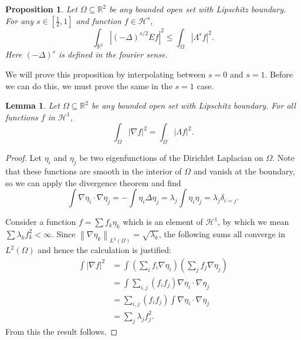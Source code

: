 \documentclass[11pt]{amsart}
\newtheorem{proposition}[theorem]{Proposition}
\newtheorem{lemma}[theorem]{Lemma}
\theoremstyle{remark}
\theoremstyle{definition}
\newcommand{\R}{\mathbb{R}}
\newcommand{\norm}[1]{\left\lVert#1\right\rVert}
\newcommand{\paren}[1]{\left( #1 \right)}
\newcommand{\abs}[1]{\left\lvert #1 \right\rvert}
\newcommand{\del}{\partial}
\newcommand{\grad}{\nabla}
\renewcommand{\div}{\operatorname{div}}
\newcommand{\Laplace}{\Delta}
\newcommand{\eigen}[1]{\eta_{#1}} %
\newcommand{\HD}{\mathcal{H}}
\begin{document}
\begin{proposition} \label{thm:hadamard 3 lines}
Let $\Omega \subseteq \R^2$ be any bounded open set with Lipschitz boundary.  For any $s \in [\frac{1}{2},1]$ and function $f \in \HD^s$,
\[ \int_{\R^2} \abs{\paren{-\Laplace}^{s/2} E f}^2 \leq \int_\Omega \abs{\Lambda^s f}^2. \]
Here $\paren{-\Laplace}^s$ is defined in the fourier sense.  
\end{proposition}

We will prove this proposition by interpolating between $s = 0$ and $s=1$.  Before we can do this, we must prove the same in the $s=1$ case.  

\begin{lemma} \label{thm:H1 and H1}
Let $\Omega \subseteq \R^2$ be any bounded open set with Lipschitz boundary.  For all functions $f$ in $\HD^1$,
\[ \int_\Omega \abs{\grad f}^2 = \int_\Omega \abs{\Lambda f}^2. \]
\end{lemma}

\begin{proof}
Let $\eigen{i}$ and $\eigen{j}$ be two eigenfunctions of the Dirichlet Laplacian on $\Omega$.  Note that these functions are smooth in the interior of $\Omega$ and vanish at the boundary, so we can apply the divergence theorem and find
\[ \int \grad \eigen{i} \cdot \grad \eigen{j} = - \int \eigen{i} \Laplace \eigen{j} = \lambda_j \int \eigen{i} \eigen{j} = \lambda_j \delta_{i=j}. \]

Consider a function $f = \sum f_k \eigen{k}$ which is an element of $\HD^1$, by which we mean $\sum \lambda_k f_k^2 < \infty$.  Since $\norm{\grad \eigen{k}}_{L^2(\Omega)} = \sqrt{\lambda_k}$, the following sums all converge in $L^2(\Omega)$ and hence the calculation is justified:
\begin{align*}
\int \abs{\grad f}^2 &= \int \paren{\sum_i f_i \grad \eigen{i} } \paren{\sum_j f_j \grad \eigen{j}}
\\ &= \int \sum_{i,j} (f_i f_j) \grad \eigen{i} \cdot \grad \eigen{j}
\\ &= \sum_{i,j} (f_i f_j) \int \grad \eigen{i} \cdot \grad \eigen{j}
\\ &= \sum_j \lambda_j f_j^2.
\end{align*}
From this the result follows.
\end{proof}
\end{document}
